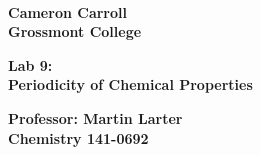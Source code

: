 \documentclass[fleqn,titlepage]{article}
\begin{document}
\begin{titlepage}
  \mbox{}\\[1.25cm]
  \textbf{\LARGE Cameron Carroll \\ Grossmont College}\\[2.25cm]
  \begin{center}
    \textbf{\huge Lab 9: \\ Periodicity of Chemical Properties}\\[2.50cm]
  \end{center}
  \textbf{\LARGE Professor: Martin Larter \\ Chemistry 141-0692} \\
  \vfill
  
\end{titlepage}

\end{document}

